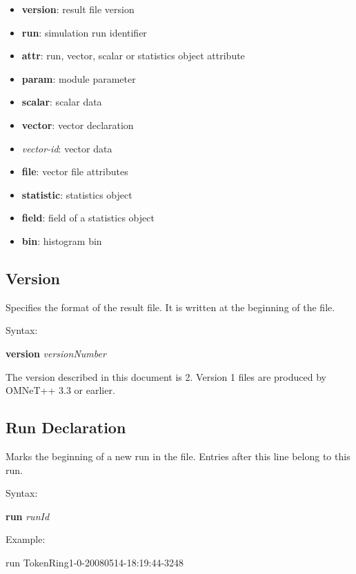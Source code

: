 \begin{itemize}
    \item \textbf{version}: result file version
    \item \textbf{run}: simulation run identifier
    \item \textbf{attr}: run, vector, scalar or statistics object attribute
    \item \textbf{param}: module parameter
    \item \textbf{scalar}: scalar data
    \item \textbf{vector}: vector declaration
    \item \textit{vector-id}: vector data
    \item \textbf{file}: vector file attributes
    \item \textbf{statistic}: statistics object
    \item \textbf{field}: field of a statistics object
    \item \textbf{bin}: histogram bin
\end{itemize}


\subsection{Version}
\label{sec:result-file-formats:opp:version}

Specifies the format of the result file. It is written at the beginning of the file.

Syntax:

\hspace{20mm} \textbf{version} \textit{versionNumber}

The version described in this document is 2. Version 1 files are produced
by OMNeT++ 3.3 or earlier.


\subsection{Run Declaration}
\label{sec:result-file-formats:opp:run-declaration}

Marks the beginning of a new run in the file. Entries after this line
belong to this run.

Syntax:

\hspace{20mm} \textbf{run} \textit{runId}

Example:

\begin{filelisting}
run TokenRing1-0-20080514-18:19:44-3248
\end{filelisting}

